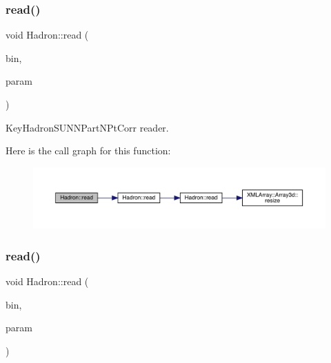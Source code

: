 \subsubsection{\texorpdfstring{read()}{read()}\hspace{0.1cm}{\footnotesize\ttfamily [53/94]}}
{\footnotesize\ttfamily void Hadron\+::read (\begin{DoxyParamCaption}\item[{\mbox{\hyperlink{classADATIO_1_1BinaryReader}{Binary\+Reader}} \&}]{bin,  }\item[{\mbox{\hyperlink{structHadron_1_1KeyHadronSUNNPartNPtCorr__t}{Key\+Hadron\+S\+U\+N\+N\+Part\+N\+Pt\+Corr\+\_\+t}} \&}]{param }\end{DoxyParamCaption})}



Key\+Hadron\+S\+U\+N\+N\+Part\+N\+Pt\+Corr reader. 

Here is the call graph for this function\+:
\nopagebreak
\begin{figure}[H]
\begin{center}
\leavevmode
\includegraphics[width=350pt]{d1/daf/namespaceHadron_a475e00d642e0578e7bbe956bbbf37aac_cgraph}
\end{center}
\end{figure}
\mbox{\label{namespaceHadron_a60758467521910899dec197e7fbc0ab4}} 
\subsubsection{\texorpdfstring{read()}{read()}\hspace{0.1cm}{\footnotesize\ttfamily [54/94]}}
{\footnotesize\ttfamily void Hadron\+::read (\begin{DoxyParamCaption}\item[{\mbox{\hyperlink{classADATIO_1_1BinaryReader}{Binary\+Reader}} \&}]{bin,  }\item[{\mbox{\hyperlink{structHadron_1_1KeyHadronNode__t_1_1Quark__t}{Key\+Hadron\+Node\+\_\+t\+::\+Quark\+\_\+t}} \&}]{param }\end{DoxyParamCaption})}



